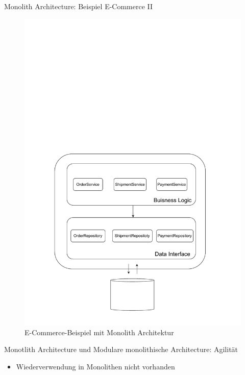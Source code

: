 \begin{frame}{Monolith Architecture: Beispiel E-Commerce II}
    \begin{figure}[!h]
        \centering
        \includegraphics[scale=0.55]{imglib/mono/mono-example}
        \caption{E-Commerce-Beispiel mit Monolith Architektur}
        \label{fig:microkernel-ecommerce}
    \end{figure}
\end{frame}

\begin{frame}{Monotlith Architecture und Modulare monolithische Architecture: Agilität}
    \begin{itemize}
      \item Wiederverwendung in Monolithen nicht vorhanden
    \end{itemize}
\end{frame}


